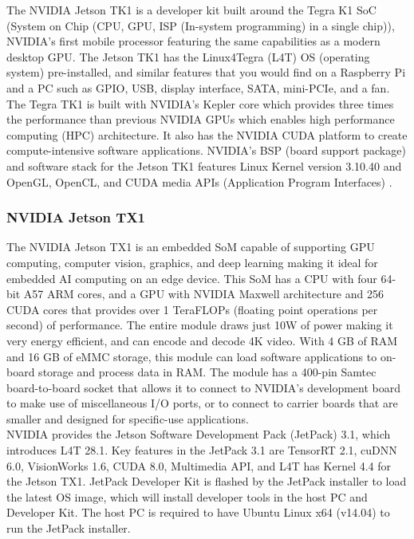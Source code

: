 \documentclass[letterpaper,10pt,serif,draftclsnofoot,onecolumn,compsoc,titlepage]{IEEEtran}
\begin{document}
The NVIDIA Jetson TK1 is a developer kit built around the Tegra K1 SoC (System 
on Chip (CPU, GPU, ISP (In-system programming) in a single chip)), NVIDIA's first 
mobile processor featuring the same capabilities as a 
modern desktop GPU\cite{JetsonTK1, TK1Wiki}. The Jetson TK1 has the Linux4Tegra (L4T)
OS (operating system) pre-installed, and similar features that you would find on a 
Raspberry Pi and a PC such as GPIO, USB, display interface, SATA, mini-PCIe, and a
fan\cite{RPiHDWR, TK1Wiki}. The Tegra TK1 is built with NVIDIA's Kepler core which 
provides three times the performance than previous NVIDIA GPUs which enables high 
performance computing (HPC) architecture. It also has the NVIDIA CUDA platform to 
create compute-intensive software applications\cite{KeplerArch}. NVIDIA's BSP (board 
support package) and software stack for the Jetson TK1 features Linux Kernel version 
3.10.40 and OpenGL, OpenCL, and CUDA media APIs (Application Program Interfaces)
\cite{TK1L4T}. \\

\subsubsection{NVIDIA Jetson TX1}

The NVIDIA Jetson TX1 is an embedded SoM capable of supporting GPU computing, computer 
vision, graphics, and deep learning making it ideal for embedded AI computing
on an edge device. This SoM has a CPU with four 64-bit A57 ARM cores, and a GPU with 
NVIDIA Maxwell architecture and 256 CUDA cores that provides over 1 TeraFLOPs (floating 
point operations per second) of performance\cite{TX1Wiki, JetsonGenius}. The entire module 
draws just 10W of power making it very energy efficient, and can encode and decode 4K 
video. With 4 GB of RAM and 16 GB of eMMC storage, this module can load software 
applications to on-board storage and process data in RAM\cite{LinuxDot}. The module has 
a 400-pin Samtec board-to-board socket that allows it to connect to NVIDIA's development
board to make use of miscellaneous I/O ports, or to connect to carrier boards that are 
smaller and designed for specific-use applications.\\

NVIDIA provides the Jetson Software Development Pack (JetPack) 3.1, which introduces 
L4T 28.1. Key features in the JetPack 3.1 are TensorRT 2.1, cuDNN 6.0, VisionWorks 1.6, 
CUDA 8.0, Multimedia API, and L4T has Kernel 4.4 for the Jetson TX1. JetPack Developer 
Kit is flashed by the JetPack installer to load the latest OS image, which will install 
developer tools in the host PC and Developer Kit. The host PC is required to have 
Ubuntu Linux x64 (v14.04) to run the JetPack installer\cite{JetPack, JetPackRel}.\\ 
\end{document}
